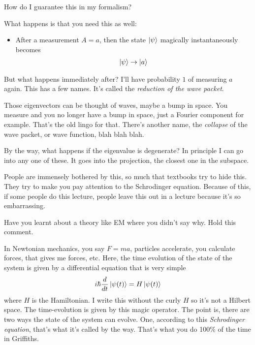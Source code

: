 How do I guarantee this in my formalism?

What happens is that you need this as well:
\begin{itemize}
    \item After a measurement $A=a$,
        then the state $\ket{\psi}$ magically instantaneously becomes
        \begin{align}
            \ket{\psi}\to \ket{a}
        \end{align}
\end{itemize}
But what happens immediately after?
I'll have probability $1$ of measuring $a$ again.
This has a few names.
It's called the \emph{reduction of the wave packet}.

Those eigenvectors can be thought of waves,
maybe a bump in space.
You measure and you no longer have a bump in space,
just a Fourier component for example.
That's the old lingo for that.
There's another name,
the \emph{collapse} of the wave packet,
or wave function, blah blah blah.

By the way, what happens if the eigenvalue is degenerate?
In principle I can go into any one of these.
It goes into the projection,
the closest one in the subspace.

People are immensely bothered by this,
so much that textbooks try to hide this.
They try to make you pay attention to the Schrodinger equation.
Because of this,
if some people do this lecture,
people leave this out in a lecture
because it's so embarrassing.

Have you learnt about a theory like EM where you didn't say why.
Hold this comment.

In Newtonian mechanics, you say $F=ma$,
particles accelerate, you calculate forces,
that gives me forces, etc.
Here,
the time evolution of the state of the system is given by a differential equation
that is very simple
\begin{align}
    i\hbar \frac{d}{dt} \ket{\psi(t)} = H\ket{\psi(t)}
\end{align}
where $H$ is the Hamiltonian.
I write this without the curly $H$ so it's not a Hilbert space.
The time-evolution is given by this magic operator.
The point is,
there are two ways the state of the system can evolve.
One,
according to this \emph{Schrodinger equation},
that's what it's called by the way.
That's what you do 100\% of the time in Griffiths.

